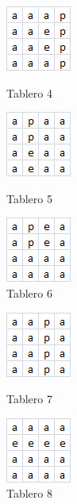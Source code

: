 \begin{figure}[!htb]
  \includegraphics[scale=1]{imagenes/tab4.png}
  \caption{Tablero 4}\label{fig:tab4}
\endminipage\hfill
{}
  \includegraphics[scale=1]{imagenes/tab5.png}
  \caption{Tablero 5}\label{fig:tab5}
\endminipage\hfill
{}%
  \includegraphics[scale=1]{imagenes/tab6.png}
  \caption{Tablero 6}\label{fig:tab6}
\endminipage
\end{figure}




\begin{figure}[!htb]
  \includegraphics[scale=1]{imagenes/tab7.png}
  \caption{Tablero 7}\label{fig:tab7}
\endminipage
{}
  \includegraphics[scale=1]{imagenes/tab8.png}
  \caption{Tablero 8}\label{fig:tab8}
\endminipage
\end{figure}

